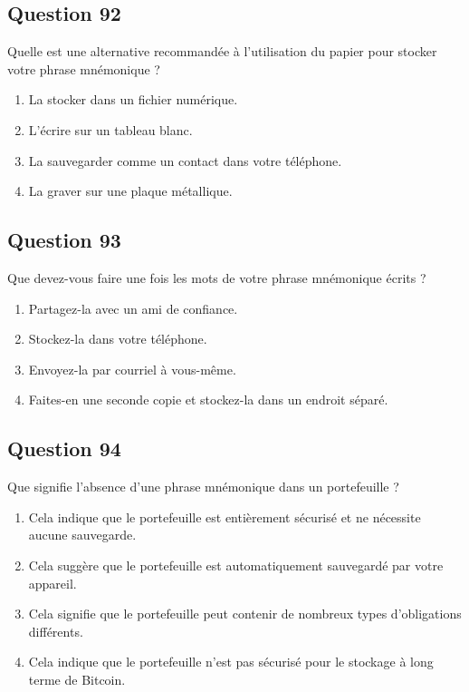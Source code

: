 \documentclass[12pt,a4paper]{article}
\begin{document}
\bigskip


\subsection*{Question 92}
Quelle est une alternative recommandée à l'utilisation du papier pour stocker votre phrase mnémonique ?

\begin{enumerate}[label=\Alph*., leftmargin=*]
\item La stocker dans un fichier numérique.
\item L'écrire sur un tableau blanc.
\item La sauvegarder comme un contact dans votre téléphone.
\item La graver sur une plaque métallique.
\end{enumerate}

\bigskip


\subsection*{Question 93}
Que devez-vous faire une fois les mots de votre phrase mnémonique écrits ?

\begin{enumerate}[label=\Alph*., leftmargin=*]
\item Partagez-la avec un ami de confiance.
\item Stockez-la dans votre téléphone.
\item Envoyez-la par courriel à vous-même.
\item Faites-en une seconde copie et stockez-la dans un endroit séparé.
\end{enumerate}

\bigskip


\subsection*{Question 94}
Que signifie l'absence d'une phrase mnémonique dans un portefeuille ?

\begin{enumerate}[label=\Alph*., leftmargin=*]
\item Cela indique que le portefeuille est entièrement sécurisé et ne nécessite aucune sauvegarde.
\item Cela suggère que le portefeuille est automatiquement sauvegardé par votre appareil.
\item Cela signifie que le portefeuille peut contenir de nombreux types d'obligations différents.
\item Cela indique que le portefeuille n'est pas sécurisé pour le stockage à long terme de Bitcoin.
\end{enumerate}
\end{document}
